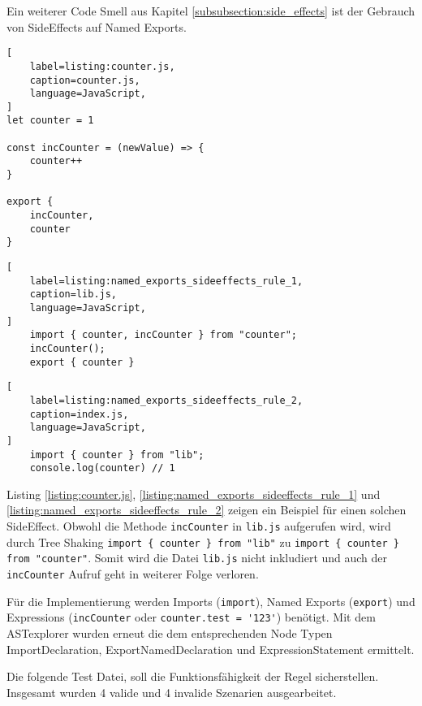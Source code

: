 Ein weiterer Code Smell aus Kapitel \ref{subsubsection:side_effects} ist der Gebrauch von SideEffects auf Named Exports.

\begin{lstlisting}[
    label=listing:counter.js,
	caption=counter.js,
	language=JavaScript,
]
let counter = 1

const incCounter = (newValue) => {
	counter++
}

export {
	incCounter,
	counter
}
\end{lstlisting}

\begin{lstlisting}[
    label=listing:named_exports_sideeffects_rule_1,
	caption=lib.js,
	language=JavaScript,
]
	import { counter, incCounter } from "counter";
	incCounter();
	export { counter }
\end{lstlisting}

\begin{lstlisting}[
    label=listing:named_exports_sideeffects_rule_2,
	caption=index.js,
	language=JavaScript,
]
	import { counter } from "lib";
	console.log(counter) // 1
\end{lstlisting}

Listing \ref{listing:counter.js}, \ref{listing:named_exports_sideeffects_rule_1} und \ref{listing:named_exports_sideeffects_rule_2} zeigen ein Beispiel für einen solchen SideEffect. Obwohl die Methode \lstinline{incCounter} in \lstinline{lib.js} aufgerufen wird, wird durch Tree Shaking \lstinline|import { counter } from "lib"| zu \lstinline|import { counter } from "counter"|. Somit wird die Datei \lstinline{lib.js} nicht inkludiert und auch der \lstinline{incCounter} Aufruf geht in weiterer Folge verloren.

Für die Implementierung werden Imports (\lstinline{import}), Named Exports  (\lstinline{export}) und Expressions (\lstinline{incCounter} oder \lstinline{counter.test = '123'}) benötigt. Mit dem ASTexplorer wurden erneut die dem entsprechenden Node Typen ImportDeclaration, ExportNamedDeclaration und ExpressionStatement ermittelt.

Die folgende Test Datei, soll die Funktionsfähigkeit der Regel sicherstellen. Insgesamt wurden 4 valide und 4 invalide Szenarien ausgearbeitet.

